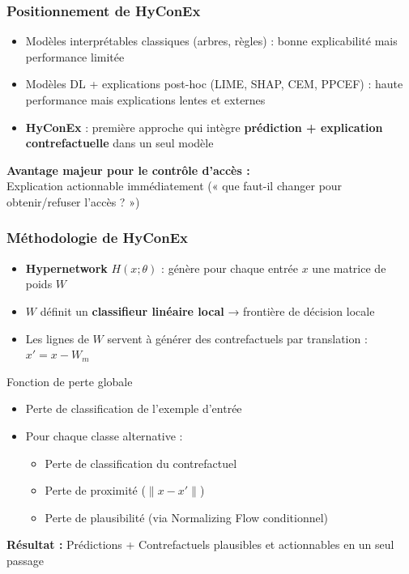 \documentclass{beamer}
\begin{document}
\begin{frame}
\frametitle{Positionnement de HyConEx}

\begin{itemize}
    \item Modèles interprétables classiques (arbres, règles) : bonne explicabilité mais performance limitée
    \item Modèles DL + explications post-hoc (LIME, SHAP, CEM, PPCEF) : haute performance mais explications lentes et externes
    \item \textbf{HyConEx} : première approche qui intègre \textbf{prédiction + explication contrefactuelle} dans un seul modèle
\end{itemize}

\begin{center}
\textbf{Avantage majeur pour le contrôle d'accès :} \\
Explication actionnable immédiatement (« que faut-il changer pour obtenir/refuser l'accès ? »)
\end{center}

\end{frame}

\begin{frame}
\frametitle{Méthodologie de HyConEx}

\begin{itemize}
    \item \textbf{Hypernetwork} $H(x;\theta)$ : génère pour chaque entrée $x$ une matrice de poids $W$
    \item $W$ définit un \textbf{classifieur linéaire local} → frontière de décision locale
    \item Les lignes de $W$ servent à générer des contrefactuels par translation : $x' = x - W_m$
\end{itemize}

\vspace{0.4cm}

\begin{block}{Fonction de perte globale}
\begin{itemize}
    \item Perte de classification de l'exemple d'entrée
    \item Pour chaque classe alternative :
    \begin{itemize}
        \item Perte de classification du contrefactuel
        \item Perte de proximité ($\|x - x'\|$)
        \item Perte de plausibilité (via Normalizing Flow conditionnel)
    \end{itemize}
\end{itemize}
\end{block}

\begin{center}
\textbf{Résultat :} Prédictions + Contrefactuels plausibles et actionnables en un seul passage
\end{center}

\end{frame}
\end{document}
